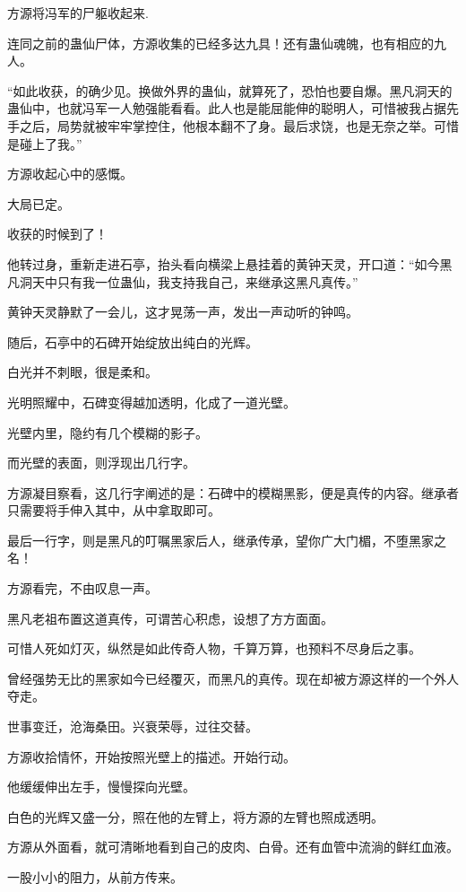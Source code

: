 
\begin{this_body}

方源将冯军的尸躯收起来.

连同之前的蛊仙尸体，方源收集的已经多达九具！还有蛊仙魂魄，也有相应的九人。

“如此收获，的确少见。换做外界的蛊仙，就算死了，恐怕也要自爆。黑凡洞天的蛊仙中，也就冯军一人勉强能看看。此人也是能屈能伸的聪明人，可惜被我占据先手之后，局势就被牢牢掌控住，他根本翻不了身。最后求饶，也是无奈之举。可惜是碰上了我。”

方源收起心中的感慨。

大局已定。

收获的时候到了！

他转过身，重新走进石亭，抬头看向横梁上悬挂着的黄钟天灵，开口道：“如今黑凡洞天中只有我一位蛊仙，我支持我自己，来继承这黑凡真传。”

黄钟天灵静默了一会儿，这才晃荡一声，发出一声动听的钟鸣。

随后，石亭中的石碑开始绽放出纯白的光辉。

白光并不刺眼，很是柔和。

光明照耀中，石碑变得越加透明，化成了一道光壁。

光壁内里，隐约有几个模糊的影子。

而光壁的表面，则浮现出几行字。

方源凝目察看，这几行字阐述的是：石碑中的模糊黑影，便是真传的内容。继承者只需要将手伸入其中，从中拿取即可。

最后一行字，则是黑凡的叮嘱黑家后人，继承传承，望你广大门楣，不堕黑家之名！

方源看完，不由叹息一声。

黑凡老祖布置这道真传，可谓苦心积虑，设想了方方面面。

可惜人死如灯灭，纵然是如此传奇人物，千算万算，也预料不尽身后之事。

曾经强势无比的黑家如今已经覆灭，而黑凡的真传。现在却被方源这样的一个外人夺走。

世事变迁，沧海桑田。兴衰荣辱，过往交替。

方源收拾情怀，开始按照光壁上的描述。开始行动。

他缓缓伸出左手，慢慢探向光壁。

白色的光辉又盛一分，照在他的左臂上，将方源的左臂也照成透明。

方源从外面看，就可清晰地看到自己的皮肉、白骨。还有血管中流淌的鲜红血液。

一股小小的阻力，从前方传来。


\end{this_body}
